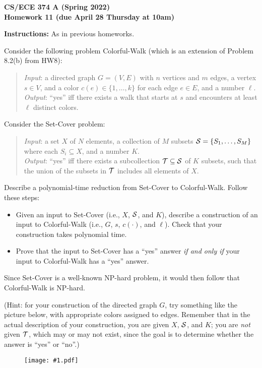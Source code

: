 \documentclass[11pt]{article}
\newcommand{\fig}[2]{\begin{figure}[h]\begin{center}%
  \texttt{[image: \#1.pdf]}\end{center}%
  \end{figure}}
\begin{document}
\begin{center}\Large\bf 
CS/ECE 374 A (Spring 2022)\\
{\Large Homework 11} (due April 28 Thursday at 10am)
\end{center}

\medskip
\noindent
{\bf Instructions:} As in previous homeworks.  


\begin{description}
\bigskip
\item[Problem 11.1:]  
Consider the following problem {\sc Colorful-Walk} (which is an extension of Problem 8.2(b) from HW8):
\begin{quote}
{\em Input\/}: a directed graph $G=(V,E)$ with $n$ vertices and $m$ edges, a vertex $s\in V$,
and a color $c(e)\in \{1,\ldots,k\}$ for each edge $e\in E$, and a number $\ell$.\\[2pt]
{\em Output\/}: ``yes'' iff there exists a walk that starts at $s$ and encounters at least $\ell$
distinct colors.
\end{quote}

Consider the {\sc Set-Cover} problem:
\begin{quote}
{\em Input\/}: a set $X$ of $N$ elements, a collection of $M$ subsets ${\cal S} =\{S_1,\ldots,S_M\}$ where each $S_i\subseteq X$,
and a number $K$.\\[2pt]
{\em Output\/}: ``yes'' iff there exists a subcollection ${\cal T}\subseteq {\cal S}$  of $K$ subsets, such that
the union of the subsets in ${\cal T}$ includes all elements of $X$.
\end{quote}

Describe a polynomial-time reduction from {\sc Set-Cover} to {\sc Colorful-Walk}.  Follow these steps:
\begin{itemize}
\item Given an input to {\sc Set-Cover} (i.e., $X$, ${\cal S}$, and $K$),
describe a construction of an input to {\sc Colorful-Walk} (i.e., $G$, $s$, $c(\cdot)$, and $\ell$).
Check that your construction takes polynomial time.
\item Prove that the input to {\sc Set-Cover} has a ``yes'' answer \emph{if and only if} your input to {\sc Colorful-Walk} has a ``yes'' answer.
\end{itemize}
Since {\sc Set-Cover} is a well-known NP-hard problem, it would then follow that {\sc Colorful-Walk} is NP-hard.  

(Hint: for your construction of the directed graph $G$, try something like the picture below,  
with appropriate colors assigned to edges.  Remember that in the actual description of your construction, 
you are given $X$, ${\cal S}$, and $K$; you are \emph{not} given ${\cal T}$, which may or may not exist, since the goal is to determine whether the answer is ``yes'' or ``no''.)
\fig{hw11fig}{0.9}


\end{description}
\end{document}
